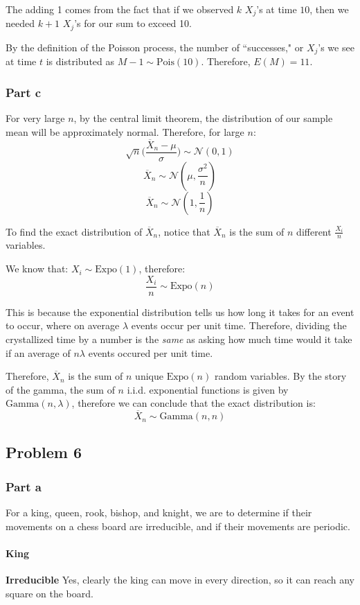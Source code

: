 \documentclass{article}
\begin{document}
The adding 1 comes from the fact that if we observed $k$ $X_{j}$'s at time $10$, then we needed $k + 1$ $X_{j}$'s for our sum to exceed 10.

By the definition of the Poisson process, the number of ``successes," or $X_{j}$'s we see at time $t$ is distributed as $M - 1 \sim \text{Pois}(10)$. Therefore, $E(M) = 11$.

\subsubsection{Part c}
For very large $n$, by the central limit theorem, the distribution of our sample mean will be approximately normal. Therefore, for large $n$: 
$$\sqrt{n}\bigg(\frac{\overline{X}_{n} - \mu}{\sigma}\bigg) \sim \mathcal{N}(0, 1)$$
$$\overline{X}_{n} \sim \mathcal{N}(\mu, \frac{\sigma^{2}}{n})$$
$$\overline{X}_{n} \sim \mathcal{N}(1, \frac{1}{n})$$

To find the exact distribution of $\overline{X}_{n}$, notice that $\overline{X}_{n}$ is the sum of $n$ different $\frac{X_{i}}{n}$ variables. 

We know that: $X_{i} \sim \text{Expo}(1)$, therefore:
$$\frac{X_{i}}{n} \sim \text{Expo}(n)$$

This is because the exponential distribution tells us how long it takes for an event to occur, where on average $\lambda$ events occur per unit time. Therefore, dividing the crystallized time by a number is the \textit{same} as asking how much time would it take if an average of $n\lambda$ events occured per unit time. 

Therefore, $\overline{X}_{n}$ is the sum of $n$ unique $\text{Expo}(n)$ random variables. By the story of the gamma, the sum of $n$ i.i.d. exponential functions is given by $\text{Gamma}(n, \lambda)$, therefore we can conclude that the exact distribution is:
$$\overline{X}_{n} \sim \text{Gamma}(n, n)$$

\subsection{Problem 6}
\subsubsection{Part a}
For a king, queen, rook, bishop, and knight, we are to determine if their movements on a chess board are irreducible, and if their movements are periodic.

\paragraph{King\\}
\textbf{Irreducible}
Yes, clearly the king can move in every direction, so it can reach any square on the board.
\end{document}
